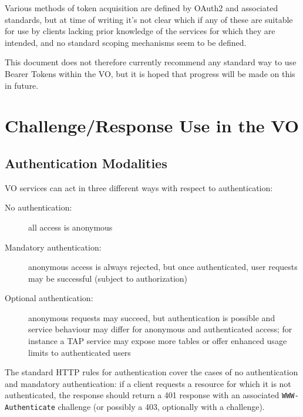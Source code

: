 \documentclass[11pt,a4paper]{ivoa}
\newcommand{\header}[1]{{\tt #1}}
\begin{document}
Various methods of token acquisition are defined by OAuth2 and
associated standards, but at time of writing it's not clear which if
any of these are suitable for use by clients lacking prior knowledge
of the services for which they are intended,
and no standard scoping mechanisms seem to be defined.

This document does not therefore currently recommend any standard way
to use Bearer Tokens within the VO, but it is hoped that
progress will be made on this in future.



\section{Challenge/Response Use in the VO}

\subsection{Authentication Modalities}
\label{sec:modalities}

VO services can act in three different ways with respect to authentication:
\begin{description}
  \item[No authentication:]
       all access is anonymous
  \item[Mandatory authentication:]
       anonymous access is always rejected, but once authenticated,
       user requests may be successful (subject to authorization)
  \item[Optional authentication:]
       anonymous requests may succeed, but authentication is possible
       and service behaviour may differ for anonymous and authenticated access;
       for instance a TAP service may expose more tables or offer enhanced
       usage limits to authenticated users
\end{description}

The standard HTTP rules for authentication cover the cases of
no authentication and mandatory authentication:
if a client requests a resource for which it is not authenticated,
the response should return a 401 response with an associated
\header{WWW-Authenticate} challenge
(or possibly a 403, optionally with a challenge).
\end{document}
